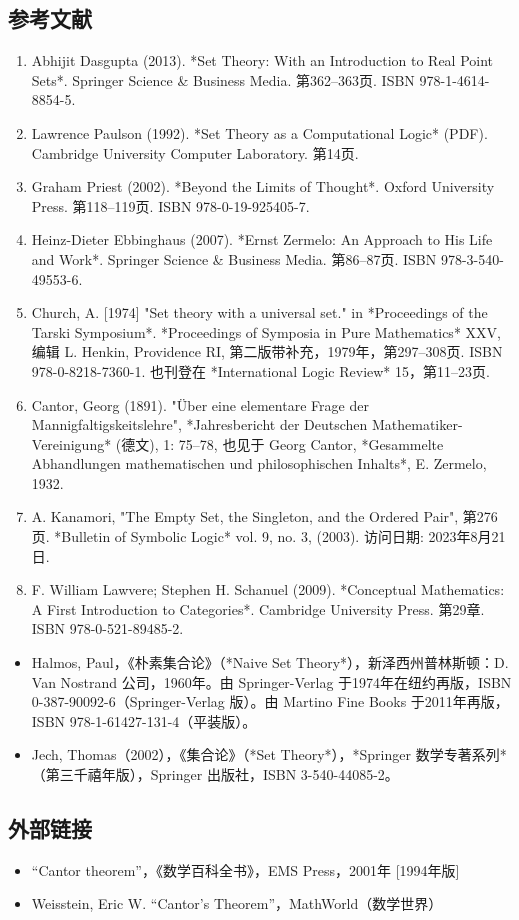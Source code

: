 \subsection{参考文献}
\begin{enumerate}
\item Abhijit Dasgupta (2013). *Set Theory: With an Introduction to Real Point Sets*. Springer Science & Business Media. 第362–363页. ISBN 978-1-4614-8854-5.
\item Lawrence Paulson (1992). *Set Theory as a Computational Logic* (PDF). Cambridge University Computer Laboratory. 第14页.
\item Graham Priest (2002). *Beyond the Limits of Thought*. Oxford University Press. 第118–119页. ISBN 978-0-19-925405-7.
\item Heinz-Dieter Ebbinghaus (2007). *Ernst Zermelo: An Approach to His Life and Work*. Springer Science & Business Media. 第86–87页. ISBN 978-3-540-49553-6.
\item Church, A. [1974] "Set theory with a universal set." in *Proceedings of the Tarski Symposium*. *Proceedings of Symposia in Pure Mathematics* XXV, 编辑 L. Henkin, Providence RI, 第二版带补充，1979年，第297–308页. ISBN 978-0-8218-7360-1. 也刊登在 *International Logic Review* 15，第11–23页.
\item Cantor, Georg (1891). "Über eine elementare Frage der Mannigfaltigskeitslehre", *Jahresbericht der Deutschen Mathematiker-Vereinigung* (德文), 1: 75–78, 也见于 Georg Cantor, *Gesammelte Abhandlungen mathematischen und philosophischen Inhalts*, E. Zermelo, 1932.
\item A. Kanamori, "The Empty Set, the Singleton, and the Ordered Pair", 第276页. *Bulletin of Symbolic Logic* vol. 9, no. 3, (2003). 访问日期: 2023年8月21日.
\item F. William Lawvere; Stephen H. Schanuel (2009). *Conceptual Mathematics: A First Introduction to Categories*. Cambridge University Press. 第29章. ISBN 978-0-521-89485-2.
\end{enumerate}
\begin{itemize}
\item Halmos, Paul，《朴素集合论》（*Naive Set Theory*），新泽西州普林斯顿：D. Van Nostrand 公司，1960年。由 Springer-Verlag 于1974年在纽约再版，ISBN 0-387-90092-6（Springer-Verlag 版）。由 Martino Fine Books 于2011年再版，ISBN 978-1-61427-131-4（平装版）。
\item Jech, Thomas（2002），《集合论》（*Set Theory*），*Springer 数学专著系列*（第三千禧年版），Springer 出版社，ISBN 3-540-44085-2。
\end{itemize}
\subsection{外部链接}
\begin{itemize}
\item “Cantor theorem”，《数学百科全书》，EMS Press，2001年 [1994年版]
\item Weisstein, Eric W. “Cantor's Theorem”，MathWorld（数学世界）
\end{itemize}